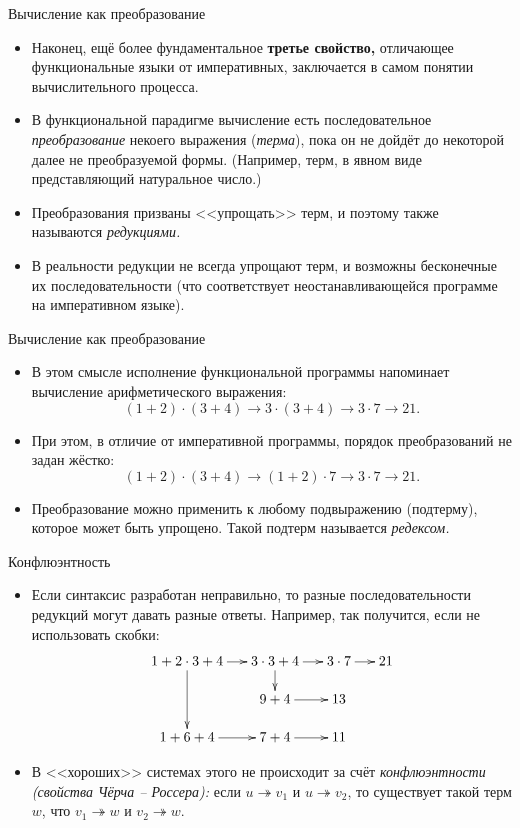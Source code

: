 \documentclass[xcolor=dvipsnames]{beamer}
\begin{document}
\begin{frame}{Вычисление как преобразование}

\begin{itemize}[<+->]
 \item Наконец, ещё более фундаментальное {\bf третье свойство,} отличающее функциональные языки от императивных, заключается в самом понятии вычислительного процесса.
 \item В функциональной парадигме вычисление есть последовательное {\em преобразование} некоего выражения ({\em терма}), пока он не дойдёт до некоторой далее не преобразуемой формы. (Например, терм, в явном виде представляющий натуральное число.)
 \item Преобразования призваны <<упрощать>> терм, и поэтому также называются {\em редукциями.}
 \item В реальности редукции не всегда упрощают терм, и возможны бесконечные их последовательности (что соответствует неостанавливающейся программе на императивном языке).
\end{itemize}

 
\end{frame}

\begin{frame}{Вычисление как преобразование}

\begin{itemize}[<+->]
 \item В этом смысле исполнение функциональной программы напоминает вычисление арифметического выражения:
 \[
  (1+2) \cdot (3+4) \to 
  3 \cdot (3+4) \to 3 \cdot 7 \to 21.
 \]
\item При этом, в отличие от императивной программы, порядок преобразований не задан жёстко:
\[
 (1+2) \cdot (3+4) \to 
 (1+2) \cdot 7 \to 3 \cdot 7 \to 21.
\]

\item Преобразование можно применить к любому подвыражению (подтерму), которое может быть упрощено. Такой подтерм называется {\em редексом.}
\end{itemize}


 
\end{frame}


\begin{frame}{Конфлюэнтность}

\begin{itemize}[<+->]
\item Если синтаксис разработан неправильно, то разные последовательности редукций могут давать разные ответы. Например, так получится, если не использовать скобки:
\[
\xymatrix@-1em{
1+2 \cdot 3+4 \ar[r]\ar[dd] & 3 \cdot 3 + 4 \ar[r]\ar[d] & 3 \cdot 7 \ar[r] & 21\\
& 9 + 4 \ar[r] & 13\\
1+6+4 \ar[r] & 7+4 \ar[r] & 11
}
\]
\item В <<хороших>> системах этого не происходит за счёт {\em конфлюэнтности (свойства Чёрча -- Россера):}
если $u \twoheadrightarrow v_1$ и $u \twoheadrightarrow v_2$, то существует такой терм $w$, что $v_1 \twoheadrightarrow w$ и $v_2 \twoheadrightarrow w$.
\end{itemize}

 
\end{frame}
\end{document}
